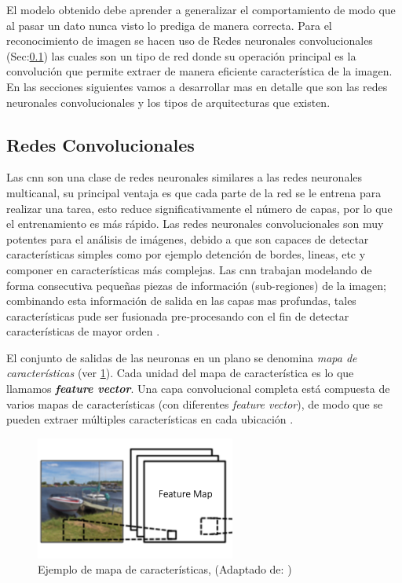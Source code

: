 El modelo obtenido debe aprender a generalizar el comportamiento de modo que al pasar un dato nunca visto lo prediga de manera correcta. Para el reconocimiento de imagen se hacen uso de Redes neuronales convolucionales (Sec:\ref{sub:cnn}) las cuales son un tipo de red donde su operación principal es la convolución que permite extraer de manera eficiente característica de la imagen.   En las secciones siguientes vamos a desarrollar mas en detalle que son las redes neuronales convolucionales y los tipos de arquitecturas que existen. 


\subsection{Redes Convolucionales}\label{sub:cnn}

Las \ac{cnn} son una clase de redes neuronales  similares a las redes neuronales multicanal, su principal ventaja es que cada parte de la red se le entrena para realizar una tarea, esto reduce significativamente el número de capas, por lo que el entrenamiento es más rápido. Las redes neuronales convolucionales son muy potentes para el análisis de imágenes, debido a que son capaces de detectar características simples como por ejemplo detención de bordes, lineas, etc y componer en características más complejas. Las \ac{cnn} trabajan modelando de forma consecutiva pequeñas piezas de información (sub-regiones) de la imagen; combinando esta información de salida en las capas mas profundas, tales características pude ser fusionada pre-procesando con el fin de detectar características de mayor orden \citep{murphy}.

El conjunto de salidas de las neuronas en un plano se denomina \textit{mapa de características} (ver \ref{Fig: fmaps}). Cada unidad  del mapa de característica es lo que llamamos  \textit{\textbf{feature vector}}. Una capa convolucional completa está compuesta de varios mapas de características (con diferentes 
\textit{feature vector}), de modo que se pueden extraer múltiples características en cada ubicación \citep{cnns}.

\begin{figure}[H]
 \centering
  \includegraphics[scale=1,keepaspectratio=true,clip=true]{imagenes/MarcoTeorico/fmaps.png}
  \caption{Ejemplo de mapa de características, (Adaptado de: \citep{cnnsarticle})}
	\label{Fig: fmaps}
\end{figure}

